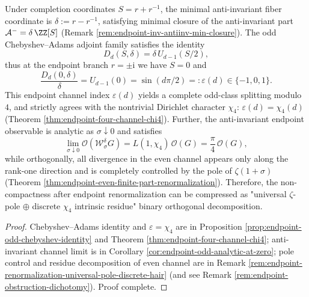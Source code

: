 \begin{conclusion}\label{con:xi-terminal-endpoint-renormalization-zeta-chi4-orthogonal}
Under completion coordinates \(S=r+r^{-1}\), the minimal anti-invariant fiber coordinate is \(\delta:=r-r^{-1}\), satisfying minimal closure of the anti-invariant part
\(
\mathcal{A}^{-}=\delta\,\ZZ[S]
\)
(Remark \ref{rem:endpoint-inv-antiinv-min-closure}).
The odd Chebyshev--Adams adjoint family satisfies the identity
\[
D_d(S,\delta)=\delta\,U_{d-1}(S/2),
\]
thus at the endpoint branch \(r=\pm\mathrm{i}\) we have \(S=0\) and
\[
\frac{D_d(0,\delta)}{\delta}=U_{d-1}(0)=\sin(d\pi/2)=:\varepsilon(d)\in\{-1,0,1\}.
\]
This endpoint channel index \(\varepsilon(d)\) yields a complete odd-class splitting modulo \(4\), and strictly agrees with the nontrivial Dirichlet character \(\chi_4\): \(\varepsilon(d)=\chi_4(d)\) (Theorem \ref{thm:endpoint-four-channel-chi4}).
Further, the anti-invariant endpoint observable is analytic as \(\sigma\downarrow 0\) and satisfies
\[
\lim_{\sigma\downarrow 0}\mathcal O(\mathcal W_{\sigma}^{\delta}G)
=L(1,\chi_4)\,\mathcal O(G)=\frac{\pi}{4}\,\mathcal O(G),
\]
while orthogonally, all divergence in the even channel appears only along the rank-one direction and is completely controlled by the pole of \(\zeta(1+\sigma)\) (Theorem \ref{thm:endpoint-even-finite-part-renormalization}).
Therefore, the non-compactness after endpoint renormalization can be compressed as "universal \(\zeta\)-pole \(\oplus\) discrete \(\chi_4\) intrinsic residue" binary orthogonal decomposition.
\end{conclusion}
\begin{proof}[Proof]
Chebyshev--Adams identity and \(\varepsilon=\chi_4\) are in Proposition \ref{prop:endpoint-odd-chebyshev-identity} and Theorem \ref{thm:endpoint-four-channel-chi4};
anti-invariant channel limit is in Corollary \ref{cor:endpoint-odd-analytic-at-zero};
pole control and residue decomposition of even channel are in Remark \ref{rem:endpoint-renormalization-universal-pole-discrete-hair} (and see Remark \ref{rem:endpoint-obstruction-dichotomy}).
Proof complete.
\end{proof}

